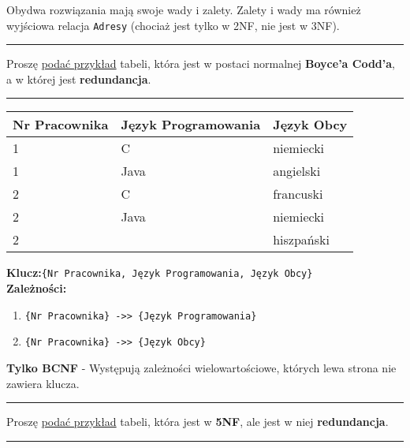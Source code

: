 \documentclass[a5paper,6pt]{article}
\newcommand{\horrule}[1]{\rule{\linewidth}{#1}}
\begin{document}
    Obydwa rozwiązania mają swoje wady i zalety. Zalety i wady ma również
    wyjściowa relacja \texttt{Adresy} (chociaż jest tylko w 2NF, nie jest w
    3NF).

\pagebreak

    \horrule{0.5pt}
    Proszę \underline{podać przykład} tabeli, która jest w postaci normalnej
    \textbf{Boyce’a Codd’a}, a w której jest \textbf{redundancja}.\\
    \horrule{0.5pt}

    \vskip 0.5cm

    \begin{center}
    \begin{tabular}{|l|l|l|}
        \hline
        \textbf{Nr Pracownika} &
        \textbf{Język Programowania} &
        \textbf{Język Obcy}\\
        \hline
        1 & C & niemiecki \\
        \hline
        1 & Java & angielski \\
        \hline
        2 & C & francuski \\
        \hline
        2 & Java & niemiecki \\
        \hline
        2 &  & hiszpański \\
        \hline
        \end{tabular}
    \end{center}

    \vskip 0.5cm

    \textbf{Klucz:}\texttt{\{Nr Pracownika, Język Programowania, Język Obcy\}}\\
    \textbf{Zależności:}
    \begin{enumerate}
        \item \texttt{\{Nr Pracownika\} ->> \{Język Programowania\}}
        \item \texttt{\{Nr Pracownika\} ->> \{Język Obcy\}}
    \end{enumerate}

    \begin{tcolorbox}
    \textbf{Tylko BCNF} - Występują zależności wielowartościowe, których lewa
    strona nie zawiera klucza.
    \end{tcolorbox}


    \horrule{0.5pt}
    Proszę \underline{podać przykład} tabeli, która jest w \textbf{5NF},
    ale jest w niej \textbf{redundancja}.\\
    \horrule{0.5pt}
\end{document}
